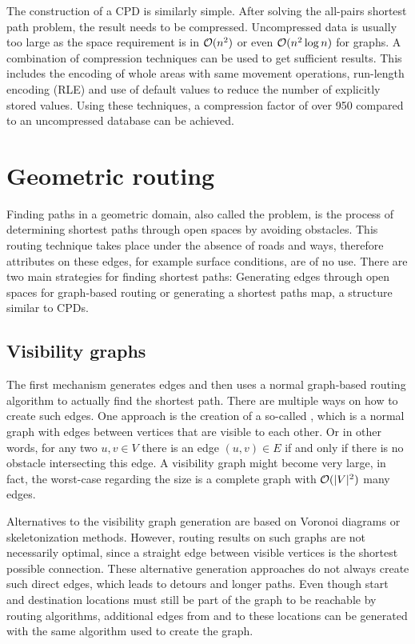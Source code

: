 			The construction of a CPD\cite{botea-cpd-2013} is similarly simple.
			After solving the all-pairs shortest path problem, the result needs to be compressed.
			Uncompressed data is usually too large as the space requirement is in $\mathcal{O}(n^2)$ or even $\mathcal{O}(n^2 \log n)$ for graphs.
			A combination of compression techniques can be used to get sufficient results.
			This includes the encoding of whole areas with same movement operations, run-length encoding (RLE) and use of default values to reduce the number of explicitly stored values\cite{botea-cpd-2013}.
			Using these techniques, a compression factor of over 950 compared to an uncompressed database can be achieved.
	
\section{Geometric routing}
\label{sec:geometric-routing}

	Finding paths in a geometric domain, also called the  problem, is the process of determining shortest paths through open spaces by avoiding obstacles.
	This routing technique takes place under the absence of roads and ways, therefore attributes on these edges, for example surface conditions, are of no use.
	There are two main strategies for finding shortest paths:
	Generating edges through open spaces for graph-based routing or generating a shortest paths map, a structure similar to CPDs.
	
	\subsection{Visibility graphs}
	\label{subsec:visibility-graph}
	
		The first mechanism generates edges and then uses a normal graph-based routing algorithm to actually find the shortest path.
		There are multiple ways on how to create such edges.
		One approach is the creation of a so-called , which is a normal graph with edges between vertices that are visible to each other.
		Or in other words, for any two $u, v \in V$ there is an edge $(u, v) \in E$ if and only if there is no obstacle intersecting this edge.
		A visibility graph might become very large, in fact, the worst-case regarding the size is a complete graph with $\mathcal{O}(|V|^2)$ many edges.
		
		Alternatives to the visibility graph generation are based on Voronoi diagrams or skeletonization methods.
		However, routing results on such graphs are not necessarily optimal, since a straight edge between visible vertices is the shortest possible connection.
		These alternative generation approaches do not always create such direct edges\cite{graser-osm-open-spaces}, which leads to detours and longer paths.
		Even though start and destination locations must still be part of the graph to be reachable by routing algorithms, additional edges from and to these locations can be generated with the same algorithm used to create the graph.
	
